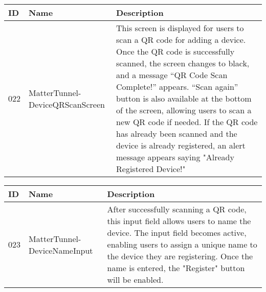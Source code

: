 \documentclass[conference]{IEEEtran}
\begin{document}
\begin{enumerate}[itemsep=2ex, parsep=1ex]
\begin{enumerate}[itemsep=2ex, parsep=1ex]
	      	      \begin{table}[h!]
	      	      	\def\arraystretch{1.24} \small
	      	      	\begin{tabular}{|p{1.2cm}|p{2.5cm}|p{4.0cm}|}
	      	      		\hline
	      	      		ID  & Name                            & Description                                                                                                                                                                                                                                                                                                                                                                                                                                                            \\
	      	      		\hline
	      	      		022 & MatterTunnel-DeviceQRScanScreen & This screen is displayed for users to scan a QR code for adding a device. Once the QR code is successfully scanned, the screen changes to black, and a message “QR Code Scan Complete!” appears. “Scan again” button is also available at the bottom of the screen, allowing users to scan a new QR code if needed. If the QR code has already been scanned and the device is already registered, an alert message appears saying "Already Registered Device!" \\
	      	      		\hline
	      	      	\end{tabular}
	      	      \end{table}
	      	      
	      	      \begin{table}[h!]
	      	      	\def\arraystretch{1.24} \small
	      	      	\begin{tabular}{|p{1.2cm}|p{2.5cm}|p{4.0cm}|}
	      	      		\hline
	      	      		ID  & Name                         & Description                                                                                                                                                                                                                                                          \\
	      	      		\hline
	      	      		023 & MatterTunnel-DeviceNameInput & After successfully scanning a QR code, this input field allows users to name the device. The input field becomes active, enabling users to assign a unique name to the device they are registering. Once the name is entered, the "Register" button will be enabled. \\
	      	      		\hline
	      	      	\end{tabular}
	      	      \end{table}
	      	      

\end{enumerate}
\end{enumerate}
\end{document}
